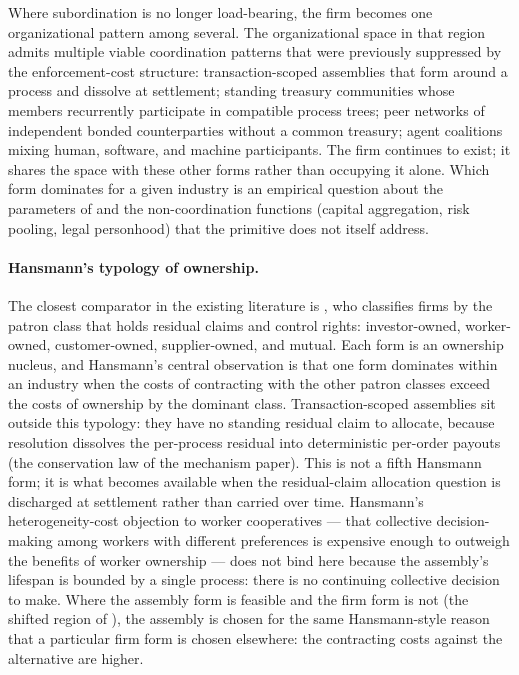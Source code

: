 \documentclass[11pt,a4paper]{article}
\theoremstyle{definition}
\theoremstyle{remark}
\begin{document}
Where subordination is no longer load-bearing, the firm becomes one
organizational pattern among several. The organizational space in
that region admits multiple viable coordination patterns that were
previously suppressed by the enforcement-cost structure:
transaction-scoped assemblies that form around a process and
dissolve at settlement; standing treasury communities whose members
recurrently participate in compatible process trees; peer networks
of independent bonded counterparties without a common treasury;
agent coalitions mixing human, software, and machine participants.
The firm continues to exist; it shares the space with these other
forms rather than occupying it alone. Which form dominates for a
given industry is an empirical question about the parameters of
 and the non-coordination functions
(capital aggregation, risk pooling, legal personhood) that the
primitive does not itself address.

\paragraph{Hansmann's typology of ownership.}
The closest comparator in the existing literature is
\citet{hansmann1996ownership}, who classifies firms by the patron
class that holds residual claims and control rights: investor-owned,
worker-owned, customer-owned, supplier-owned, and mutual. Each
form is an ownership nucleus, and Hansmann's central observation is
that one form dominates within an industry when the costs of
contracting with the other patron classes exceed the costs of
ownership by the dominant class. Transaction-scoped assemblies sit
outside this typology: they have no standing residual claim to
allocate, because resolution dissolves the per-process residual
into deterministic per-order payouts (the conservation law of the
mechanism paper). This is not a fifth Hansmann form; it is what
becomes available when the residual-claim allocation question is
discharged at settlement rather than carried over time. Hansmann's
heterogeneity-cost objection to worker cooperatives --- that
collective decision-making among workers with different preferences
is expensive enough to outweigh the benefits of worker ownership ---
does not bind here because the assembly's lifespan is bounded by a
single process: there is no continuing collective decision to make.
Where the assembly form is feasible and the firm form is not (the
shifted region of ), the assembly is
chosen for the same Hansmann-style reason that a particular firm
form is chosen elsewhere: the contracting costs against the
alternative are higher.
\end{document}
